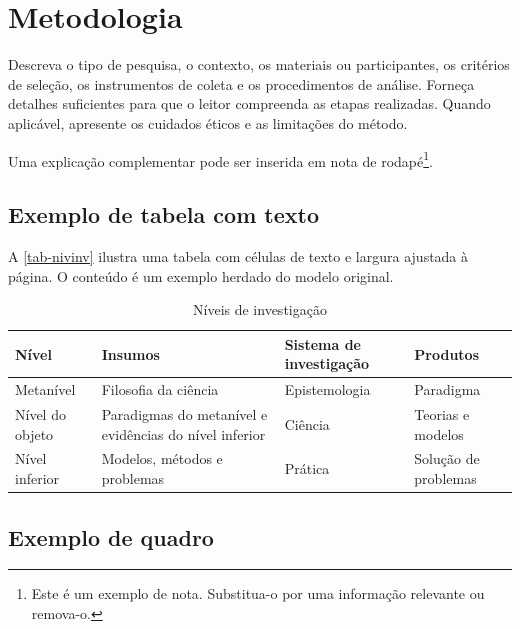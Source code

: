 \section{Metodologia}
\label{sec:metodologia}

Descreva o tipo de pesquisa, o contexto, os materiais ou participantes, os
critérios de seleção, os instrumentos de coleta e os procedimentos de análise.
Forneça detalhes suficientes para que o leitor compreenda as etapas realizadas.
Quando aplicável, apresente os cuidados éticos e as limitações do método.

Uma explicação complementar pode ser inserida em nota de rodapé\footnote{Este
é um exemplo de nota. Substitua-o por uma informação relevante ou remova-o.}.

\subsection{Exemplo de tabela com texto}

A \autoref{tab-nivinv} ilustra uma tabela com células de texto e largura
ajustada à página. O conteúdo é um exemplo herdado do modelo original.

\begin{table}[htb]
  \centering
  \caption{Níveis de investigação}
  \label{tab-nivinv}
  {\ABNTEXfontereduzida
  \begin{tabularx}{\linewidth}{>{\raggedright\arraybackslash}X
    >{\raggedright\arraybackslash}X
    >{\raggedright\arraybackslash}X
    >{\raggedright\arraybackslash}X}
    \toprule
    \textbf{Nível} & \textbf{Insumos} & \textbf{Sistema de investigação} & \textbf{Produtos} \\
    \midrule
    Metanível & Filosofia da ciência & Epistemologia & Paradigma \\
    Nível do objeto & Paradigmas do metanível e evidências do nível inferior
      & Ciência & Teorias e modelos \\
    Nível inferior & Modelos, métodos e problemas & Prática & Solução de problemas \\
    \bottomrule
  \end{tabularx}}
\end{table}

\subsection{Exemplo de quadro}

